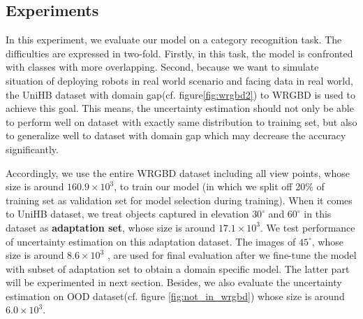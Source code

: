 \subsection{Experiments }
In this experiment, we evaluate our model on a category recognition task. The difficulties are expressed in two-fold. Firstly, in this task, the model is confronted with classes with more overlapping. Second, because we want to simulate situation of deploying robots in real world scenario and facing data in real world, the UniHB dataset with domain gap(cf. figure\ref{fig:wrgbd2}) to WRGBD is used to achieve this goal. This means, the uncertainty estimation should not only be able to perform well on dataset with exactly same distribution to training set, but also to generalize well to dataset with domain gap which may decrease the accuracy significantly.

Accordingly, we use the entire WRGBD dataset including all view points, whose size is around $160.9\times10^3$, to train our model (in which we split off 20\% of training set as validation set for model selection during training). When it comes to UniHB dataset, we treat objects captured in elevation $30^\circ$ and $60^\circ$ in this dataset as \textbf{adaptation set}, whose size is around $17.1\times10^3$. We test performance of uncertainty estimation on this adaptation dataset. The images of $45^\circ$, whose size is around $8.6\times10^3$ , are used for final evaluation after we fine-tune the model with subset of adaptation set to obtain a domain specific model. The latter part will be experimented in next section. Besides, we also evaluate the uncertainty estimation on OOD dataset(cf. figure \ref{fig:not_in_wrgbd}) whose size is around $6.0\times10^3$. 

